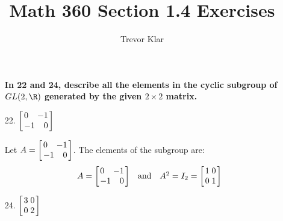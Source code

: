 \documentclass[letterpaper]{article}
\title{Math 360 \linebreak
Section 1.4 Exercises}
\author{Trevor Klar}
\begin{document}
\maketitle

\begin{enumerate}

\item[\phantom{1.}]

\hspace*{-0.6cm}\textbf{In 22 and 24, describe all the elements in the cyclic subgroup of $GL(2,\R)$ generated by the given $2\times2$ matrix. }

\item[22.] $\arraycolsep=1.4pt\def\arraystretch{1}
\left[\begin{array}{lr}
0 & -1 \\
-1 & 0 \\
\end{array} \right]$

\answer Let $A=\arraycolsep=1.4pt\def\arraystretch{1}
\left[\begin{array}{lr}
0 & -1 \\
-1 & 0 \\
\end{array} \right]$. The elements of the subgroup are: 
\[\begin{array}{cccc}
	A=	
	\arraycolsep=1.4pt\def\arraystretch{1}
	\left[\begin{array}{lr}
	0 & -1 \\
	-1 & 0 \\
	\end{array} \right]
&
\text{and}
&
	A^2=I_2=	
	\arraycolsep=1.4pt\def\arraystretch{1}
	\left[\begin{array}{lr}
	1 & 0 \\
	0 & 1 \\
	\end{array} \right]
\end{array}\]

\item[24.] $\arraycolsep=1.4pt\def\arraystretch{1}
\left[\begin{array}{lr}
3 & 0 \\
0 & 2 \\
\end{array} \right]$


\end{enumerate}
\end{document}
